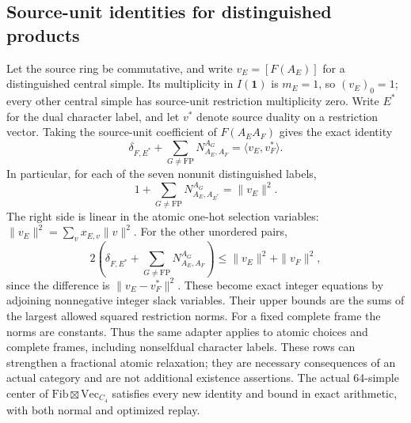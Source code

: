 \subsection{Source-unit identities for distinguished products}
Let the source ring be commutative, and write $v_E=[F(A_E)]$ for a
distinguished central simple. Its multiplicity in $I(\mathbf1)$ is
$m_E=1$, so $(v_E)_0=1$; every other central simple has source-unit
restriction multiplicity zero. Write $E^*$ for the dual character label,
and let $v^*$ denote source duality on a restriction vector. Taking the
source-unit coefficient of $F(A_EA_F)$ gives the exact identity
\[
 \delta_{F,E^*}+\sum_{G\ne\mathrm{FP}}N_{A_E,A_F}^{A_G}
 =\langle v_E,v_F^*\rangle.
\]
In particular, for each of the seven nonunit distinguished labels,
\[
 1+\sum_{G\ne\mathrm{FP}}N_{A_E,A_{E^*}}^{A_G}=\|v_E\|^2.
\]
The right side is linear in the atomic one-hot selection variables:
$\|v_E\|^2=\sum_v x_{E,v}\|v\|^2$. For the other unordered pairs,
\[
 2\left(\delta_{F,E^*}+\sum_{G\ne\mathrm{FP}}N_{A_E,A_F}^{A_G}\right)
 \leq\|v_E\|^2+\|v_F\|^2,
\]
since the difference is $\|v_E-v_F^*\|^2$. These become exact integer
equations by adjoining nonnegative integer slack variables. Their upper
bounds are the sums of the largest allowed squared restriction norms.
For a fixed complete frame the norms are constants. Thus the same adapter
applies to atomic choices and complete frames, including nonselfdual
character labels. These rows can strengthen a fractional atomic
relaxation; they are necessary consequences of an actual category and are
not additional existence assertions. The actual 64-simple center of
$\mathrm{Fib}\boxtimes\mathrm{Vec}_{C_4}$ satisfies every new identity
and bound in exact arithmetic, with both normal and optimized replay.
